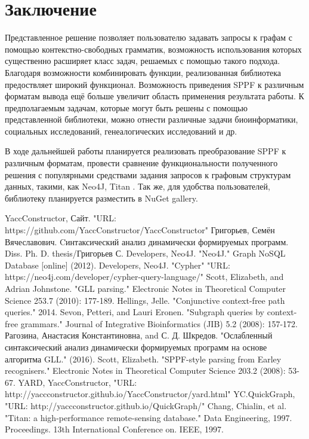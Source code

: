 \documentclass{spisok-article}
\begin{document}
\section{Заключение}
    Представленное решение позволяет пользователю задавать запросы к графам с помощью контекстно-свободных грамматик, возможность использования которых существенно расширяет класс задач, решаемых с помощью такого подхода. Благодаря возможности комбинировать функции, реализованная библиотека предоствляет широкий функционал. Возможность приведения SPPF к различным форматам вывода ещё больше увеличит область применения результата работы. К предполагаемым задачам, которые могут быть решены с помощью представленной библиотеки, можно отнести различные задачи биоинформатики, социальных исследований, генеалогических исследований и др. 
    
    В ходе дальнейшей работы планируется реализовать преобразование SPPF к различным форматам, провести сравнение функциональности полученного решения с популярными средствами задания запросов к графовым структурам данных, такими, как Neo4J, Titan \cite{Titan}. Так же, для удобства пользователей, библиотеку планируется разместить в NuGet gallery. 
    
\begin{thebibliography}{8} 
 YaccConstructor, Сайт. "URL: https://github.com/YaccConstructor/YaccConstructor"
 Григорьев, Семён Вячеславович. Cинтаксический анализ динамически формируемых программ. Diss. Ph. D. thesis/Григорьев С.
 Developers, Neo4J. "Neo4J." Graph NoSQL Database [online] (2012).
 Developers, Neo4J. "Cypher" "URL: https://neo4j.com/developer/cypher-query-language/"
 Scott, Elizabeth, and Adrian Johnstone. "GLL parsing." Electronic Notes in Theoretical Computer Science 253.7 (2010): 177-189.
 Hellings, Jelle. "Conjunctive context-free path queries." 2014.
 Sevon, Petteri, and Lauri Eronen. "Subgraph queries by context-free grammars." Journal of Integrative Bioinformatics (JIB) 5.2 (2008): 157-172.
 Рагозина, Анастасия Константиновна, and С. Д. Шкредов. "Ослабленный синтаксический анализ динамически формируемых программ на основе алгоритма GLL." (2016).
 Scott, Elizabeth. "SPPF-style parsing from Earley recognisers." Electronic Notes in Theoretical Computer Science 203.2 (2008): 53-67.
 YARD, YaccConstructor, "URL: http://yaccconstructor.github.io/YaccConstructor/yard.html"
 YC.QuickGraph, "URL: http://yaccconstructor.github.io/QuickGraph/"
 Chang, Chialin, et al. "Titan: a high-performance remote-sensing database." Data Engineering, 1997. Proceedings. 13th International Conference on. IEEE, 1997.

\end{thebibliography}
\end{document}

